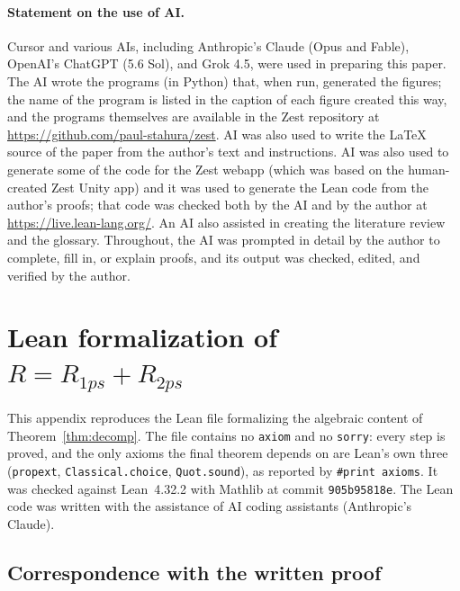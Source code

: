 \documentclass[11pt]{article}
\theoremstyle{definition}
\begin{document}
\paragraph{Statement on the use of AI.}
Cursor and various AIs, including Anthropic's Claude (Opus and Fable),
OpenAI's ChatGPT (5.6 Sol), and Grok 4.5, were used in preparing this
paper. The AI wrote the programs (in Python) that, when run, generated the
figures; the name of the program is listed in the caption of each figure
created this way, and the programs themselves are available in the Zest
repository at \url{https://github.com/paul-stahura/zest}. AI was also used
to write the \LaTeX{} source of the paper from the author's text and
instructions. AI was
also used to generate some of the code for the Zest webapp (which was based
on the human-created Zest Unity app) and it was used to generate the Lean
code from the author's proofs; that code was
checked both by the AI and by the author at
\url{https://live.lean-lang.org/}. An AI also assisted in creating the
literature review and the glossary. Throughout, the AI was prompted in
detail by the author to complete, fill in, or explain proofs, and its
output was checked, edited, and verified by the author.

\appendix

\clearpage

\section{Lean formalization of \texorpdfstring{$R=R_{1ps}+R_{2ps}$}{R = R1ps + R2ps}}
\label{app:lean-decomp}

This appendix reproduces the Lean file formalizing the algebraic content of
Theorem~\ref{thm:decomp}. The file contains no \texttt{axiom} and no
\texttt{sorry}: every step is proved, and the only axioms the final theorem
depends on are Lean's own three (\texttt{propext},
\texttt{Classical.choice}, \texttt{Quot.sound}), as reported by
\texttt{\#print axioms}. It was checked against Lean~4.32.2 with Mathlib at
commit \texttt{905b95818e}. The Lean code was written with the assistance of AI
coding assistants (Anthropic's Claude).

\subsection{Correspondence with the written proof}
\end{document}
